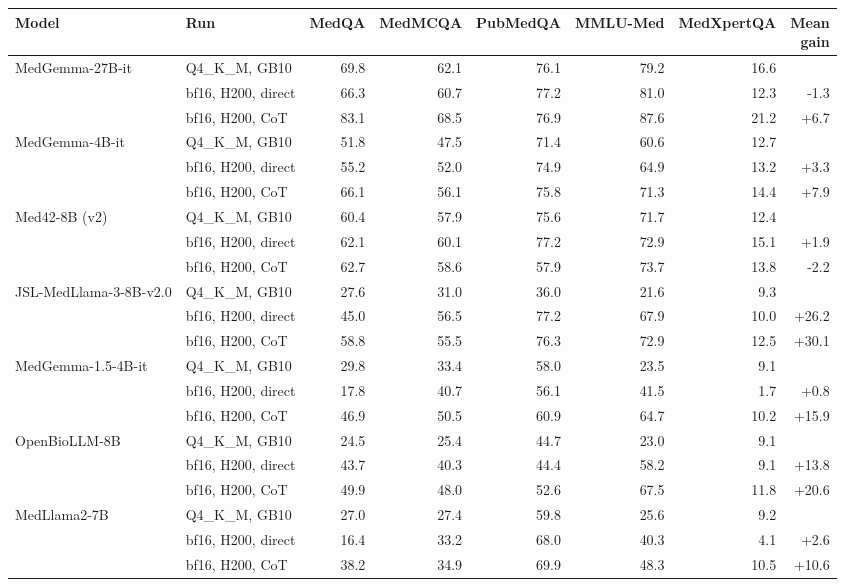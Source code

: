 \begin{tabular}{@{}llrrrrrr@{}}
\toprule
Model & Run & MedQA & MedMCQA & PubMedQA & MMLU-Med & MedXpertQA & \thead{Mean\\gain} \\
\midrule
\multirow{3}{*}{MedGemma-27B-it} & Q4\_K\_M, GB10 & 69.8 & 62.1 & 76.1 & 79.2 & 16.6 & \\
 & bf16, H200, direct & 66.3 & 60.7 & 77.2 & 81.0 & 12.3 & -1.3 \\
 & bf16, H200, CoT & 83.1 & 68.5 & 76.9 & 87.6 & 21.2 & +6.7 \\
\midrule
\multirow{3}{*}{MedGemma-4B-it} & Q4\_K\_M, GB10 & 51.8 & 47.5 & 71.4 & 60.6 & 12.7 & \\
 & bf16, H200, direct & 55.2 & 52.0 & 74.9 & 64.9 & 13.2 & +3.3 \\
 & bf16, H200, CoT & 66.1 & 56.1 & 75.8 & 71.3 & 14.4 & +7.9 \\
\midrule
\multirow{3}{*}{Med42-8B (v2)} & Q4\_K\_M, GB10 & 60.4 & 57.9 & 75.6 & 71.7 & 12.4 & \\
 & bf16, H200, direct & 62.1 & 60.1 & 77.2 & 72.9 & 15.1 & +1.9 \\
 & bf16, H200, CoT & 62.7 & 58.6 & 57.9 & 73.7 & 13.8 & -2.2 \\
\midrule
\multirow{3}{*}{JSL-MedLlama-3-8B-v2.0} & Q4\_K\_M, GB10 & 27.6 & 31.0 & 36.0 & 21.6 & 9.3 & \\
 & bf16, H200, direct & 45.0 & 56.5 & 77.2 & 67.9 & 10.0 & +26.2 \\
 & bf16, H200, CoT & 58.8 & 55.5 & 76.3 & 72.9 & 12.5 & +30.1 \\
\midrule
\multirow{3}{*}{MedGemma-1.5-4B-it} & Q4\_K\_M, GB10 & 29.8 & 33.4 & 58.0 & 23.5 & 9.1 & \\
 & bf16, H200, direct & 17.8 & 40.7 & 56.1 & 41.5 & 1.7 & +0.8 \\
 & bf16, H200, CoT & 46.9 & 50.5 & 60.9 & 64.7 & 10.2 & +15.9 \\
\midrule
\multirow{3}{*}{OpenBioLLM-8B} & Q4\_K\_M, GB10 & 24.5 & 25.4 & 44.7 & 23.0 & 9.1 & \\
 & bf16, H200, direct & 43.7 & 40.3 & 44.4 & 58.2 & 9.1 & +13.8 \\
 & bf16, H200, CoT & 49.9 & 48.0 & 52.6 & 67.5 & 11.8 & +20.6 \\
\midrule
\multirow{3}{*}{MedLlama2-7B} & Q4\_K\_M, GB10 & 27.0 & 27.4 & 59.8 & 25.6 & 9.2 & \\
 & bf16, H200, direct & 16.4 & 33.2 & 68.0 & 40.3 & 4.1 & +2.6 \\
 & bf16, H200, CoT & 38.2 & 34.9 & 69.9 & 48.3 & 10.5 & +10.6 \\
\bottomrule
\end{tabular}
